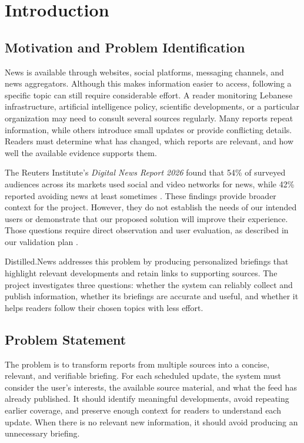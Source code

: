 \chapter{Introduction}
\label{chap:introduction}

\section{Motivation and Problem Identification}

News is available through websites, social platforms, messaging channels, and news aggregators. Although this makes information easier to access, following a specific topic can still require considerable effort. A reader monitoring Lebanese infrastructure, artificial intelligence policy, scientific developments, or a particular organization may need to consult several sources regularly. Many reports repeat information, while others introduce small updates or provide conflicting details. Readers must determine what has changed, which reports are relevant, and how well the available evidence supports them.

The Reuters Institute's \textit{Digital News Report 2026} found that 54\% of surveyed audiences across its markets used social and video networks for news, while 42\% reported avoiding news at least sometimes \cite{reuters2026}. These findings provide broader context for the project. However, they do not establish the needs of our intended users or demonstrate that our proposed solution will improve their experience. Those questions require direct observation and user evaluation, as described in our validation plan \cite{validationplan}.

Distilled.News addresses this problem by producing personalized briefings that highlight relevant developments and retain links to supporting sources. The project investigates three questions: whether the system can reliably collect and publish information, whether its briefings are accurate and useful, and whether it helps readers follow their chosen topics with less effort.

\section{Problem Statement}

The problem is to transform reports from multiple sources into a concise, relevant, and verifiable briefing. For each scheduled update, the system must consider the user's interests, the available source material, and what the feed has already published. It should identify meaningful developments, avoid repeating earlier coverage, and preserve enough context for readers to understand each update. When there is no relevant new information, it should avoid producing an unnecessary briefing.

